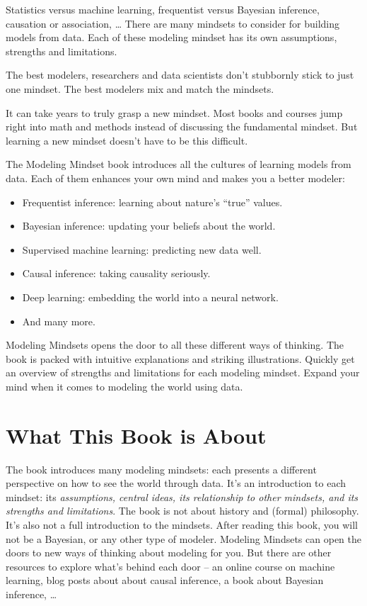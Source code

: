 \documentclass[
  10pt,
]{scrbook}
\providecommand{\tightlist}{%
  \setlength{\itemsep}{0pt}\setlength{\parskip}{0pt}}
\begin{document}
Statistics versus machine learning, frequentist versus Bayesian inference, causation or association, \ldots{}
There are many mindsets to consider for building models from data.
Each of these modeling mindset has its own assumptions, strengths and limitations.

The best modelers, researchers and data scientists don't stubbornly stick to just one mindset.
The best modelers mix and match the mindsets.

It can take years to truly grasp a new mindset.
Most books and courses jump right into math and methods instead of discussing the fundamental mindset.
But learning a new mindset doesn't have to be this difficult.

The Modeling Mindset book introduces all the cultures of learning models from data.
Each of them enhances your own mind and makes you a better modeler:

\begin{itemize}
\tightlist
\item
  Frequentist inference: learning about nature's ``true'' values.
\item
  Bayesian inference: updating your beliefs about the world.
\item
  Supervised machine learning: predicting new data well.
\item
  Causal inference: taking causality seriously.
\item
  Deep learning: embedding the world into a neural network.
\item
  And many more.
\end{itemize}

Modeling Mindsets opens the door to all these different ways of thinking.
The book is packed with intuitive explanations and striking illustrations.
Quickly get an overview of strengths and limitations for each modeling mindset.
Expand your mind when it comes to modeling the world using data.

\hypertarget{what-this-book-is-about}{%
\chapter{What This Book is About}\label{what-this-book-is-about}}

The book introduces many modeling mindsets: each presents a different perspective on how to see the world through data.
It's an introduction to each mindset: its \emph{assumptions, central ideas, its relationship to other mindsets, and its strengths and limitations}.
The book is not about history and (formal) philosophy.
It's also not a full introduction to the mindsets.
After reading this book, you will not be a Bayesian, or any other type of modeler.
Modeling Mindsets can open the doors to new ways of thinking about modeling for you.
But there are other resources to explore what's behind each door -- an online course on machine learning, blog posts about about causal inference, a book about Bayesian inference, \ldots{}
\end{document}
